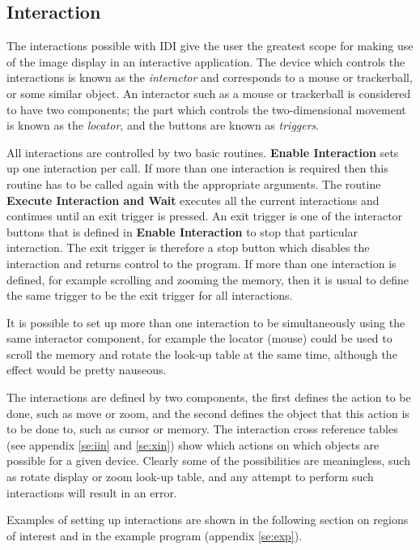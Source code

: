 \subsection{Interaction}

The interactions possible with IDI give the user the greatest scope for
making use of the image display in an interactive application. The
device which controls the interactions is known as the {\it interactor}
and corresponds to a mouse or trackerball, or some similar object.
An interactor such as a mouse or trackerball is considered to have two
components; the part which controls the two-dimensional movement is
known as the {\it locator}, and the buttons are known as {\it triggers}.

All interactions are controlled by two basic routines. {\bf Enable
Interaction} sets up one interaction per call. If more than one
interaction is required then this routine has to be called again with
the appropriate arguments. The routine {\bf Execute Interaction and
Wait} executes all the current interactions and continues until an exit
trigger is pressed. An exit trigger is one of the interactor buttons that
is defined in {\bf Enable Interaction} to stop that particular interaction.
The exit trigger is therefore a stop button which disables the interaction
and returns control to the program.
If more than one interaction is defined, for example scrolling and zooming
the memory, then it is usual to define the same trigger to be the exit
trigger for all interactions.

It is possible to set up more than one interaction to be simultaneously
using the same interactor component, for example the locator (mouse)
could be used to scroll the memory and rotate the look-up table at the
same time, although the effect would be pretty nauseous.

The interactions are defined by two components, the first defines the
action to be done, such as move or zoom, and the second defines the object
that this action is to be done to, such as cursor or memory.
The interaction cross reference tables (see appendix \ref{se:iin} and
\ref{se:xin}) show which actions on which objects are possible for a given
device. Clearly some of the possibilities are meaningless, such as rotate
display or zoom look-up table, and any attempt to perform such interactions
will result in an error.

Examples of setting up interactions are shown in the following section on
regions of interest and in the example program (appendix \ref{se:exp}).

